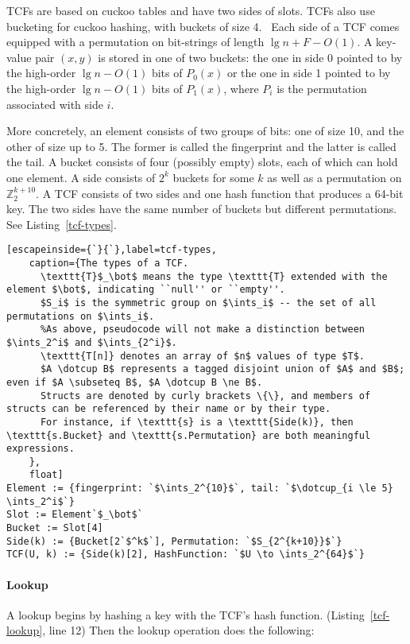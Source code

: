 \documentclass[sigconf]{acmart}
\newcommand{\ints}{\mathbb{Z}}
\newcommand{\dotcup}{\ensuremath{\mathaccent\cdot\cup}}
\begin{document}
TCFs are based on cuckoo tables and have two sides of slots.
TCFs also use bucketing for cuckoo hashing, with buckets of size 4.~\cite{buckets}
Each side of a TCF comes equipped with a permutation on bit-strings of length $\lg n + F - O(1)$.
A key-value pair $(x, y)$ is stored in one of two buckets: the one in side 0 pointed to by the high-order $\lg n - O(1)$ bits of $P_0(x)$ or the one in side 1 pointed to by the high-order $\lg n - O(1)$ bits of $P_1(x)$, where $P_i$ is the permutation associated with side $i$.

More concretely, an element consists of two groups of bits: one of size 10, and the other of size up to 5.
The former is called the fingerprint and the latter is called the tail.
A bucket consists of four (possibly empty) slots, each of which can hold one element.
A side consists of $2^k$ buckets for some $k$ as well as a permutation on $\ints_2^{k+10}$. %
A TCF consists of two sides and one hash function that produces a 64-bit key.
The two sides have the same number of buckets but different permutations.
See Listing~\ref{tcf-types}.

\begin{lstlisting}[escapeinside={`}{`},label=tcf-types,
    caption={The types of a TCF.
      \texttt{T}$_\bot$ means the type \texttt{T} extended with the element $\bot$, indicating ``null'' or ``empty''.
      $S_i$ is the symmetric group on $\ints_i$ -- the set of all permutations on $\ints_i$.
      %As above, pseudocode will not make a distinction between $\ints_2^i$ and $\ints_{2^i}$.
      \texttt{T[n]} denotes an array of $n$ values of type $T$.
      $A \dotcup B$ represents a tagged disjoint union of $A$ and $B$; even if $A \subseteq B$, $A \dotcup B \ne B$.
      Structs are denoted by curly brackets \{\}, and members of structs can be referenced by their name or by their type.
      For instance, if \texttt{s} is a \texttt{Side(k)}, then \texttt{s.Bucket} and \texttt{s.Permutation} are both meaningful expressions.
    },
    float]
Element := {fingerprint: `$\ints_2^{10}$`, tail: `$\dotcup_{i \le 5} \ints_2^i$`}
Slot := Element`$_\bot$`
Bucket := Slot[4]
Side(k) := {Bucket[2`$^k$`], Permutation: `$S_{2^{k+10}}$`}
TCF(U, k) := {Side(k)[2], HashFunction: `$U \to \ints_2^{64}$`}
\end{lstlisting}

\paragraph{Lookup}
A lookup begins by hashing a key with the TCF's hash function. (Listing~\ref{tcf-lookup}, line 12)
Then the lookup operation does the following:
\end{document}
